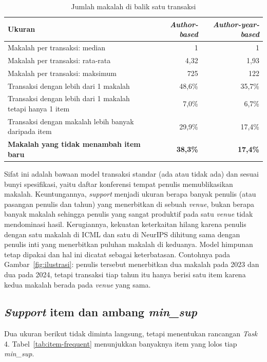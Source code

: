 \begin{table}[ht]
\caption{Jumlah makalah di balik satu transaksi}
\label{tab:npaper}
\small
\begin{tabular}{@{}lrr@{}}
\toprule
\textbf{Ukuran} & \textbf{\textit{Author-based}} & \textbf{\textit{Author-year-based}} \\
\midrule
Makalah per transaksi: median & 1 & 1 \\
Makalah per transaksi: rata-rata & 4,32 & 1,93 \\
Makalah per transaksi: maksimum & 725 & 122 \\
Transaksi dengan lebih dari 1 makalah & 48,6\% & 35,7\% \\
Transaksi dengan lebih dari 1 makalah tetapi hanya 1 item & 7,0\% & 6,7\% \\
Transaksi dengan makalah lebih banyak daripada item & 29,9\% & 17,4\% \\
\textbf{Makalah yang tidak menambah item baru} & \textbf{38,3\%} & \textbf{17,4\%} \\
\bottomrule
\end{tabular}
\end{table}

Sifat ini adalah bawaan model transaksi standar (ada atau tidak ada) dan sesuai bunyi spesifikasi, yaitu daftar konferensi tempat penulis memublikasikan makalah. Keuntungannya, \textit{support} menjadi ukuran berapa banyak penulis (atau pasangan penulis dan tahun) yang menerbitkan di sebuah \textit{venue}, bukan berapa banyak makalah sehingga penulis yang sangat produktif pada satu \textit{venue} tidak mendominasi hasil. Kerugiannya, kekuatan keterkaitan hilang karena penulis dengan satu makalah di ICML dan satu di NeurIPS dihitung sama dengan penulis inti yang menerbitkan puluhan makalah di keduanya. Model himpunan tetap dipakai dan hal ini dicatat sebagai keterbatasan. Contohnya pada Gambar~\ref{fig:ilustrasi}: penulis tersebut menerbitkan dua makalah pada 2023 dan dua pada 2024, tetapi transaksi tiap tahun itu hanya berisi satu item karena kedua makalah berada pada \textit{venue} yang sama.

\subsection{\textit{Support} item dan ambang \textit{min\_sup}}
\label{sec:hasil-support-item}
Dua ukuran berikut tidak diminta langsung, tetapi menentukan rancangan \textit{Task} 4. Tabel~\ref{tab:item-frequent} menunjukkan banyaknya item yang lolos tiap \textit{min\_sup}.

